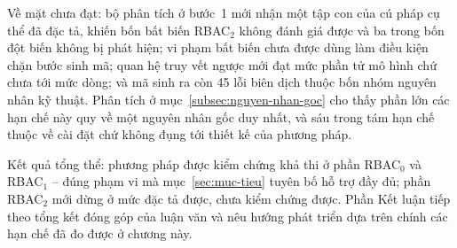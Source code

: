 Về mặt chưa đạt: bộ phân tích ở bước~1 mới nhận một tập con của cú pháp cụ thể đã đặc tả, khiến bốn bất biến RBAC$_2$ không đánh giá được và ba trong bốn đột biến không bị phát hiện; vi phạm bất biến chưa được dùng làm điều kiện chặn bước sinh mã; quan hệ truy vết ngược mới đạt mức phần tử mô hình chứ chưa tới mức dòng; và mã sinh ra còn 45 lỗi biên dịch thuộc bốn nhóm nguyên nhân kỹ thuật. Phân tích ở mục~\ref{subsec:nguyen-nhan-goc} cho thấy phần lớn các hạn chế này quy về một nguyên nhân gốc duy nhất, và sáu trong tám hạn chế thuộc về cài đặt chứ không đụng tới thiết kế của phương pháp.

Kết quả tổng thể: phương pháp được kiểm chứng khả thi ở phần RBAC$_0$ và RBAC$_1$ -- đúng phạm vi mà mục~\ref{sec:muc-tieu} tuyên bố hỗ trợ đầy đủ; phần RBAC$_2$ mới dừng ở mức đặc tả được, chưa kiểm chứng được. Phần Kết luận tiếp theo tổng kết đóng góp của luận văn và nêu hướng phát triển dựa trên chính các hạn chế đã đo được ở chương này.
